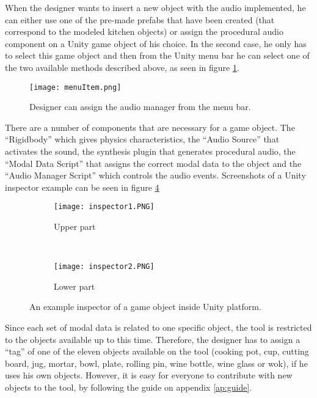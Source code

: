 When the designer wants to insert a new object with the audio implemented, he can either use one of the pre-made prefabs that have been created (that correspond to the modeled kitchen objects) or assign the procedural audio component on a Unity\textsuperscript{\textregistered} game object of his choice. In the second case, he only has to select this game object and then from the Unity\textsuperscript{\textregistered} menu bar he can select one of the two available methods described above, as seen in figure \ref{fig:menu_item}.

\begin{figure}[H]
  \centering
    \texttt{[image: menuItem.png]}
      \caption{Designer can assign the audio manager from the menu bar.}
      \label{fig:menu_item}
\end{figure}

There are a number of components that are necessary for a game object. The ``Rigidbody'' which gives physics characteristics, the ``Audio Source'' that activates the sound, the synthesis plugin that generates  procedural audio, the ``Modal Data Script'' that assigns the correct modal data to the object and the ``Audio Manager Script'' which controls the audio events. Screenshots of a Unity\textsuperscript{\textregistered} inspector example can be seen in figure \ref{fig:audio_insp} 

\begin{figure}[H]
    \centering
    \begin{subfigure}[b]{0.45\textwidth}
        \texttt{[image: inspector1.PNG]}
        \caption{Upper part}
        \label{fig:FB}
    \end{subfigure}
    ~ %
    \begin{subfigure}[b]{0.45\textwidth}
        \texttt{[image: inspector2.PNG]}
        \caption{Lower part}
        \label{fig:sin}
    \end{subfigure}
    \caption{An example inspector of a game object inside Unity\textsuperscript{\textregistered} platform.}\label{fig:audio_insp}
\end{figure}

Since each set of modal data is related to one specific object, the tool is restricted to the objects available up to this time. Therefore, the designer has to assign a ``tag'' of one of the eleven objects available on the tool (cooking pot, cup, cutting board, jug, mortar, bowl, plate, rolling pin, wine bottle, wine glass or wok), if he uses his own objects. However, it is easy for everyone to contribute with new objects to the tool, by following the guide on appendix \ref{ap:guide}.

